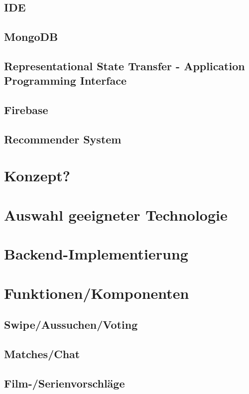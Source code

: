\documentclass[11pt,a4paper]{article}
\begin{document}
\subsection{IDE}

\subsection{MongoDB}

\subsection{Representational State Transfer - Application Programming Interface}

\subsection{Firebase}


\subsection{Recommender System}
	
		
\section{Konzept?}



\section{Auswahl geeigneter Technologie}


\section{Backend-Implementierung}


\section{Funktionen/Komponenten}

\subsection{Swipe/Aussuchen/Voting}		
\subsection{Matches/Chat}		
\subsection{Film-/Serienvorschläge}		
\end{document}
